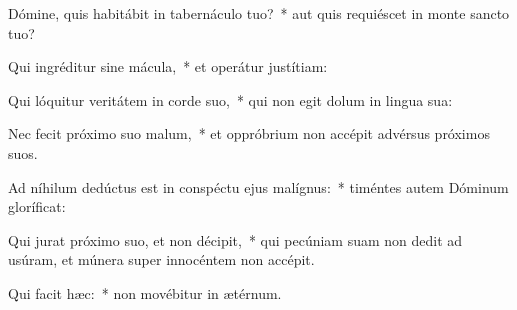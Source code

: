\item Dómine, quis habitábit in tabernáculo tuo?~* aut quis requiéscet in monte sancto tuo?

\item Qui ingréditur sine mácula,~* et operátur justítiam:

\item Qui lóquitur veritátem in corde suo,~* qui non egit dolum in lingua sua:

\item Nec fecit próximo suo malum,~* et oppróbrium non accépit advérsus próximos suos.

\item Ad níhilum dedúctus est in conspéctu ejus malígnus:~* timéntes autem Dóminum gloríficat:

\item Qui jurat próximo suo, et non décipit,~* qui pecúniam suam non dedit ad usúram, et múnera super innocéntem non accépit.

\item Qui facit hæc:~* non movébitur in ætérnum.
